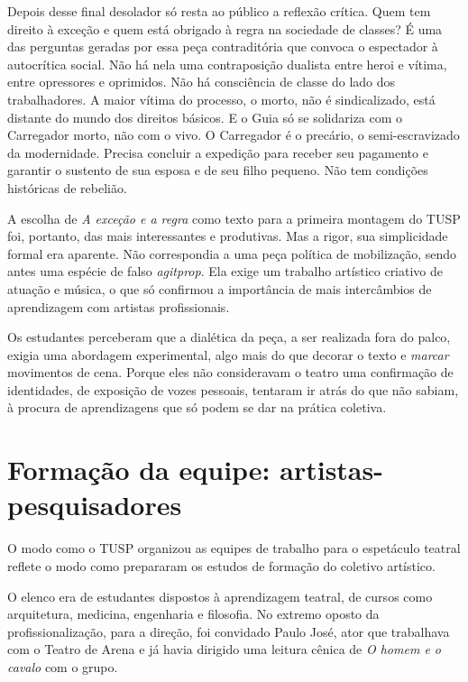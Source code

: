 Depois desse final desolador só resta ao público a reflexão crítica.
Quem tem direito à exceção e quem está obrigado à regra na sociedade de
classes? É uma das perguntas geradas por essa peça contraditória que
convoca o espectador à autocrítica social. Não há nela uma contraposição
dualista entre heroi e vítima, entre opressores e oprimidos. Não há
consciência de classe do lado dos trabalhadores. A maior vítima do
processo, o morto, não é sindicalizado, está distante do mundo dos
direitos básicos. E o Guia só se solidariza com o Carregador morto, não
com o vivo. O Carregador é o precário, o semi-escravizado da
modernidade. Precisa concluir a expedição para receber seu pagamento e
garantir o sustento de sua esposa e de seu filho pequeno. Não tem
condições históricas de rebelião.

A escolha de \textit{A exceção e a regra} como texto para a primeira
montagem do TUSP foi, portanto, das mais interessantes e produtivas. Mas
a rigor, sua simplicidade formal era aparente. Não correspondia a uma
peça política de mobilização, sendo antes uma espécie de falso
\textit{agitprop}. Ela exige um trabalho artístico criativo de atuação e
música, o que só confirmou a importância de mais intercâmbios de
aprendizagem com artistas profissionais.

Os estudantes perceberam que a dialética da peça, a ser realizada fora
do palco, exigia uma abordagem experimental, algo mais do que decorar o
texto e \textit{marcar} movimentos de cena. Porque eles não consideravam o
teatro uma confirmação de identidades, de exposição de vozes pessoais,
tentaram ir atrás do que não sabiam, à procura de aprendizagens que só
podem se dar na prática coletiva.

\section{Formação da equipe: artistas-pesquisadores}

O modo como o TUSP organizou as equipes de trabalho para o espetáculo
teatral reflete o modo como prepararam os estudos de formação do
coletivo artístico.

O elenco era de estudantes dispostos à aprendizagem teatral, de cursos
como arquitetura, medicina, engenharia e filosofia. No extremo oposto da
profissionalização, para a direção, foi convidado Paulo José, ator que
trabalhava com o Teatro de Arena e já havia dirigido uma leitura cênica
de \textit{O homem e o cavalo} com o grupo.

